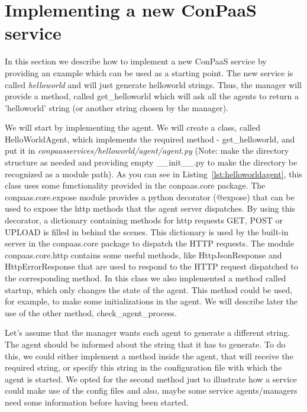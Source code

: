 \documentclass[10pt]{article}
\newcommand{\ConPaaSHOME}{../conpaas-services}
\begin{document}
\section{Implementing a new ConPaaS service}

In this section we describe how to implement a new ConPaaS service by providing an example which can be used as a starting point. The new service is called \textit{helloworld} and will just generate helloworld strings. Thus, the manager will provide a method, called get\_helloworld which will ask all the agents to return a 'helloworld' string (or another string chosen by the manager). 

We will start by implementing the agent. We will create a class, called HelloWorldAgent, which implements the required method - get\_helloworld, and put it in \textit{conpaasservices/helloworld/agent/agent.py} (Note: make the directory structure as needed and providing empty \_\_init\_\_.py to make the directory be recognized as a module path). As you can see in Listing~\ref{lst:helloworldagent}, this class uses some functionality provided in the conpaas.core package. The conpaas.core.expose module provides a python decorator (@expose) that can be used to expose the http methods that the agent server dispatches. By using this decorator, a dictionary containing methods for http requests GET, POST or UPLOAD is filled in behind the scenes. This dictionary is used by the built-in server in the conpaas.core package to dispatch the HTTP requests. The module conpaas.core.http contains some useful methods, like HttpJsonResponse and HttpErrorResponse that are used to respond to the HTTP request dispatched to the corresponding method. In this class we also implemented a method called startup, which only changes the state of the agent. This method could be used, for example, to make some initializations in the agent. We will describe later the use of the other method, check\_agent\_process.



Let's assume that the manager wants each agent to generate a different string. The agent should be informed about the string that it has to generate. To do this, we could either implement a method inside the agent, that will receive the required string, or specify this string in the configuration file with which the agent is started. We opted for the second method just to illustrate how a service could make use of the config files and also, maybe some service agents/managers need some information before having been started.
\end{document}
